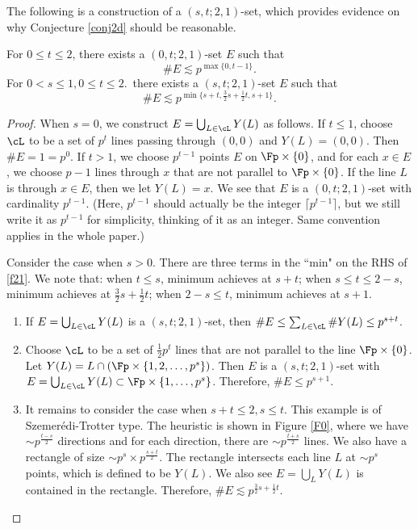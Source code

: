 The following is a construction of a $(s,t;2,1)$-set, which provides evidence on why Conjecture \ref{conj2d} should be reasonable.

\begin{proposition}\label{prop2d}
For $0\le t\le 2$, there exists a $(0,t;2,1)$-set $E$ such that
    \begin{equation}
        \#E\lesssim p^{\max\{0,t-1\}}.
    \end{equation}
For $0<s\le 1, 0\le t\le 2$.\, there exists a $(s,t;2,1)$-set $E$ such that    
    \begin{equation}\label{f21}
        \#E\lesssim p^{\min\{s+t,\frac32s+\frac12t,s+1\}}.
    \end{equation}
\end{proposition}

\begin{proof}
When $s=0$, we construct $E=\bigcup_{L\in \cL} Y(L)$ as follows. If $t\le 1$, choose $\cL$ to be a set of $p^t$ lines passing through $(0,0)$ and $Y(L)=(0,0)$. Then $\#E=1=p^0$. If $t>1$, we choose $p^{t-1}$ points $E$ on $\Fp\times \{0\}$, and for each $x\in E$, we choose $p-1$ lines through $x$ that are not parallel to $\Fp\times \{0\}$. If the line $L$ is through $x\in E$, then we let $Y(L)=x$. We see that $E$ is a $(0,t;2,1)$-set with cardinality $p^{t-1}$. (Here, $p^{t-1}$ should actually be the integer $\lceil p^{t-1}\rceil$, but we still write it as $p^{t-1}$ for simplicity, thinking of it as an integer. Same convention applies in the whole paper.) 

Consider the case when $s>0$. There are three terms in the ``min" on the RHS of \eqref{f21}. We note that: when $t\le s$, minimum achieves at $s+t$; when $s\le t\le 2-s$, minimum achieves at $\frac32s+\frac12t$; when $2-s\le t$, minimum achieves at $s+1$.
\begin{enumerate}
    \item If $E=\bigcup_{L\in\cL} Y(L)$ is a $(s,t;2,1)$-set, then $\#E\le \sum_{L\in\cL} \#Y(L)\le p^{s+t}$.

    \item Choose $\cL$ to be a set of $\frac12 p^t$ lines that are not parallel to the line $\Fp\times\{0\}$. Let $Y(L)=L\cap (\Fp\times \{1,2,\dots,p^s\})$. Then $E$ is a $(s,t;2,1)$-set with $E=\bigcup_{L\in\cL} Y(L)\subset \Fp\times \{1,\dots,p^s\}$. Therefore, $\#E\le p^{s+1}$.

    \item It remains to consider the case when $s+t\le 2, s\le t$. This example is of Szemer\'edi-Trotter type. The heuristic is shown in Figure \ref{F0}, where we have $\sim p^{\frac{t-s}{2}}$ directions and for each direction, there are $\sim p^{\frac{t+s}{2}}$ lines. We also have a rectangle of size $\sim p^{s}\times p^{\frac{s+t}{2}}$. The rectangle intersects each line $L$ at $\sim p^s$ points, which is defined to be $Y(L)$. We also see $E=\bigcup_L Y(L)$ is contained in the rectangle. Therefore, $\#E\lesssim p^{\frac32s+\frac12t}$.


\end{enumerate}
\end{proof}
